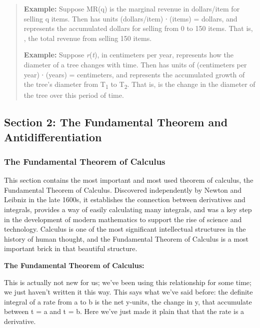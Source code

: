 \begin{quote}
\textbf{Example:} Suppose MR(q) is the marginal revenue in dollars/item
for selling q items. Then has units (dollars/item) ∙ (items) = dollars,
and represents the accumulated dollars for selling from 0 to 150 items.
That is, , the total revenue from selling 150 items.

\textbf{Example:} Suppose \emph{r}(\emph{t}), in centimeters per year,
represents how the diameter of a tree changes with time. Then has units
of (centimeters per year) ∙ (years) = centimeters, and represents the
accumulated growth of the tree's diameter from T\textsubscript{1} to
T\textsubscript{2}. That is, is the change in the diameter of the tree
over this period of time.
\end{quote}

\hypertarget{section-2-the-fundamental-theorem-and-antidifferentiation}{\subsection{Section
2: The Fundamental Theorem and
Antidifferentiation}\label{section-2-the-fundamental-theorem-and-antidifferentiation}}

\subsubsection{The Fundamental Theorem of
Calculus}\label{the-fundamental-theorem-of-calculus}

This section contains the most important and most used theorem of
calculus, the Fundamental Theorem of Calculus. Discovered independently
by Newton and Leibniz in the late 1600s, it establishes the connection
between derivatives and integrals, provides a way of easily calculating
many integrals, and was a key step in the development of modern
mathematics to support the rise of science and technology. Calculus is
one of the most significant intellectual structures in the history of
human thought, and the Fundamental Theorem of Calculus is a most
important brick in that beautiful structure.

\textbf{The Fundamental Theorem of Calculus:}

This is actually not new for us; we've been using this relationship for
some time; we just haven't written it this way. This says what we've
said before: the definite integral of a rate from a to b is the net
y-units, the change in y, that accumulate between t = a and t = b. Here
we've just made it plain that that the rate is a derivative.

